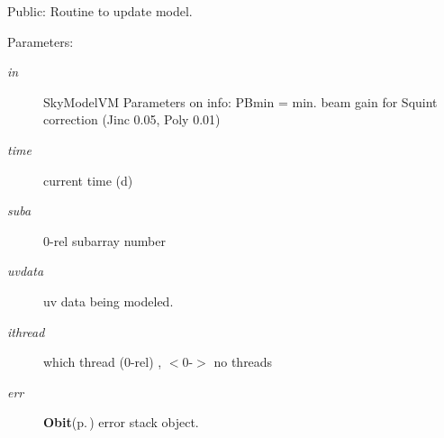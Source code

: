 Public: Routine to update model. 

\begin{Desc}
\item[Parameters:]
\begin{description}
\item[{\em in}]Sky\-Model\-VM Parameters on info: PBmin = min. beam gain for Squint correction (Jinc 0.05, Poly 0.01) \item[{\em time}]current time (d) \item[{\em suba}]0-rel subarray number \item[{\em uvdata}]uv data being modeled. \item[{\em ithread}]which thread (0-rel) , $<$0-$>$ no threads \item[{\em err}]{\bf Obit}{\rm (p.\,\pageref{structObit})} error stack object. \end{description}
\end{Desc}
